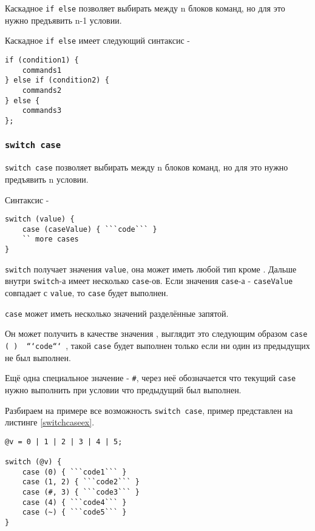 Каскадное \texttt{if else} позволяет выбирать между n блоков команд, но для это нужно предъявить n-1 условии.

Каскадное \texttt{if else} имеет следующий синтаксис -
\begin{verbatim}
if (condition1) {
	commands1
} else if (condition2) {
	commands2
} else {
	commands3
};
\end{verbatim}

\subsubsection{\texttt{switch case}}

\texttt{switch case} позволяет выбирать между n блоков команд, но для это нужно предъявить n условии.

Синтаксис -
\begin{verbatim}
switch (value) {
	case (caseValue) { ```code``` }
	`` more cases
}
\end{verbatim}

\texttt{switch} получает значения \texttt{value}, она может иметь любой тип кроме \bool. Дальше внутри \texttt{switch}-а имеет несколько \texttt{case}-ов. Если значения \texttt{case}-а - \texttt{caseValue} совпадает с \texttt{value}, то \texttt{case} будет выполнен.

\texttt{case} может иметь несколько значений разделённые запятой.

Он может получить в качестве значения \void, выглядит это следующим образом \texttt{case (~) { ```code``` }}, такой \texttt{case} будет выполнен только если ни один из предыдущих не был выполнен.

Ещё одна специальное значение - \texttt{#}, через неё обозначается что текущий \texttt{case} нужно выполнить при условии что предыдущий был выполнен.

Разбираем на примере все возможность \texttt{switch case}, пример представлен на листинге \ref{switchcaseex}.

\begin{sourcecode}
\label{switchcaseex}
\begin{verbatim}
@v = 0 | 1 | 2 | 3 | 4 | 5;

switch (@v) {
	case (0) { ```code1``` }
	case (1, 2) { ```code2``` }
	case (#, 3) { ```code3``` }
	case (4) { ```code4``` }
	case (~) { ```code5``` }
}
\end{verbatim}
\end{sourcecode}

